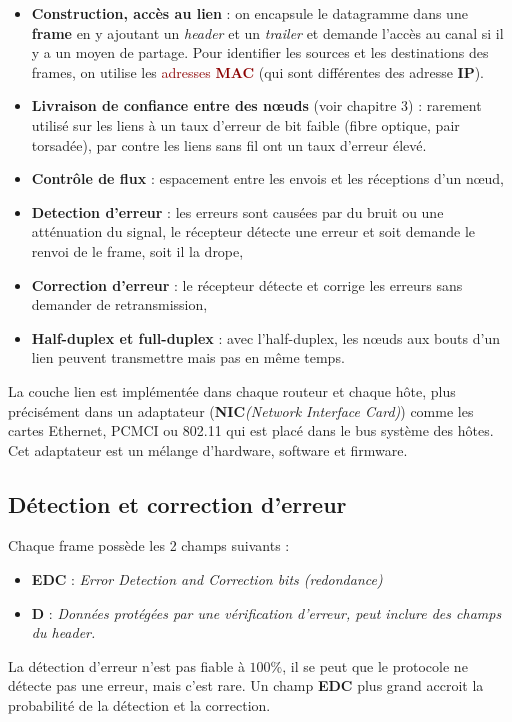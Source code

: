 \documentclass{article}
\newcommand{\red}[1]{\textcolor{darkred}{#1}}
\newcommand{\bfp}[2]{\item \textbf{#1} : \textit{#2}}
\newcommand{\neu}{n\oe ud}
\newcommand{\neuSPs}{n\oe uds }
\begin{document}
\begin{itemize}
\item \textbf{Construction, accès au lien} : on encapsule le datagramme dans une \textbf{frame} en y ajoutant un 
\textit{header} et un \textit{trailer} et demande l'accès au canal si il y a un moyen de partage. Pour 
identifier les sources et les destinations des frames, on utilise les \red{adresses \textbf{MAC}} (qui sont 
différentes des adresse \textbf{IP}).
\item \textbf{Livraison de confiance entre des \neuSPs} (voir chapitre 3) : rarement utilisé sur les liens à un 
taux d'erreur de bit faible (fibre optique, pair torsadée), par contre les liens sans fil ont un taux d'erreur 
élevé.
\item \textbf{Contrôle de flux} : espacement entre les envois et les réceptions d'un \neu ,
\item \textbf{Detection d'erreur} : les erreurs sont causées par du bruit ou une atténuation du signal, le 
récepteur détecte une erreur et soit demande le renvoi de le frame, soit il la drope,
\item \textbf{Correction d'erreur} : le récepteur détecte et corrige les erreurs sans demander de retransmission,
\item \textbf{Half-duplex et full-duplex} : avec l'half-duplex, les \neuSPs aux bouts d'un lien peuvent 
transmettre mais pas en même temps.
\end{itemize}

La couche lien est implémentée dans chaque routeur et chaque hôte, plus précisément dans un adaptateur 
(\textbf{NIC}\textit{(Network Interface Card)}) comme les cartes Ethernet, PCMCI ou 802.11 qui est placé dans le 
bus système des hôtes. Cet adaptateur est un mélange d'hardware, software et firmware.

\subsection{Détection et correction d'erreur}

Chaque frame possède les 2 champs suivants :
\begin{itemize}
\bfp{EDC}{Error Detection and Correction bits (redondance)}
\bfp{D}{Données protégées par une vérification d'erreur, peut inclure des champs du header.}
\end{itemize}
La détection d'erreur n'est pas fiable à $100\%$, il se peut que le protocole ne détecte pas une erreur, mais 
c'est rare. Un champ \textbf{EDC} plus grand accroit la probabilité de la détection et la correction.
\end{document}

